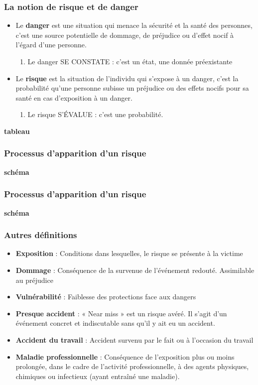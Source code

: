 \documentclass{beamer}
\begin{document}
\begin{frame}
\frametitle{La notion de risque et de danger}
\begin{itemize}
\item Le \textbf{danger} est une situation qui menace la sécurité et la santé des personnes, c’est une source potentielle de dommage, de préjudice ou d'effet nocif à l'égard d'une personne.
\begin{enumerate}
\item Le danger SE CONSTATE : c’est un état, une donnée préexistante
\end{enumerate}
\item Le \textbf{risque} est la situation de l’individu qui s’expose à un danger, c’est la probabilité qu'une personne subisse un préjudice ou des effets nocifs pour sa santé en cas d'exposition à un danger.
\begin{enumerate}
\item Le risque S’ÉVALUE : c’est une probabilité.
\end{enumerate}
\end{itemize}
\textbf{tableau}
\end{frame}

\begin{frame}
\frametitle{Processus d’apparition d’un risque}
\textbf{schéma}
\end{frame}

\begin{frame}
\frametitle{Processus d’apparition d’un risque}
\textbf{schéma}
\end{frame}


\begin{frame}
\frametitle{Autres définitions}
\begin{itemize}
\item \textbf{Exposition} : Conditions dans lesquelles, le risque se présente à la victime
\item \textbf{Dommage} : Conséquence de la survenue de l’événement redouté. Assimilable au préjudice
\item \textbf{Vulnérabilité} : Faiblesse des protections face aux dangers
\item \textbf{Presque accident} : « Near miss » est un risque avéré. Il s’agit d’un événement concret et indiscutable sans qu’il y ait eu un accident.
\item \textbf{Accident du travail} : Accident survenu par le fait ou à l’occasion du travail
\item \textbf{Maladie professionnelle} : Conséquence de l’exposition plus ou moins prolongée, dans le cadre de l’activité professionnelle, à des agents physiques, chimiques ou infectieux (ayant entraîné une maladie).
\end{itemize}
\end{frame}
\end{document}
